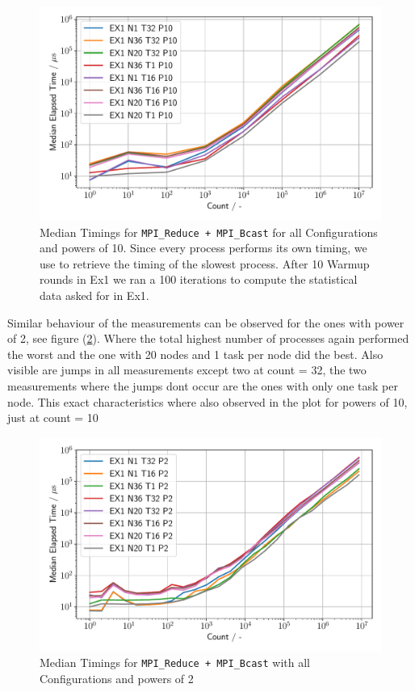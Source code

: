 \begin{figure}[h]
    \begin{center}
        \includegraphics[width=1.0\linewidth]{figures/Ex1_1.pdf}

        \caption{Median Timings for \texttt{MPI\_Reduce + MPI\_Bcast} for all Configurations 
        and powers of 10. Since every  process performs its own timing, we use 
         to retrieve the timing of the slowest process. After 10 Warmup rounds 
        in Ex1 we ran a 100 iterations to compute the statistical data asked for in Ex1.}

        \label{Ex1_P10_median}
    \end{center}
\end{figure}

Similar behaviour of the measurements can be observed for the ones with power of 2, see figure (\ref{Ex1_P2_median}).
Where the total highest number of \MPI processes again performed the worst and the one with 20 nodes and 1 task per 
node did the best. Also visible are jumps in all measurements except two at count = 32, the two measurements where the
jumps dont occur are the ones with only one task per node. This exact characteristics where also observed in the plot
for powers of 10, just at count = 10


\begin{figure}[h]
    \begin{center}
        \includegraphics[width=1\linewidth]{figures/Ex1_2.pdf}
        \caption{Median Timings for \texttt{MPI\_Reduce + MPI\_Bcast} with all Configurations and powers of 2}
        \label{Ex1_P2_median}
    \end{center}
\end{figure}